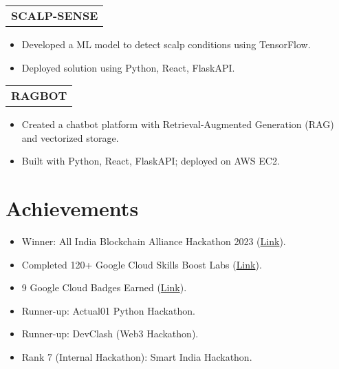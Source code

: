 \documentclass[a4paper,10pt]{article}
\begin{document}
\begin{tabularx}{\linewidth}{@{}X@{}}
\textbf{SCALP-SENSE} \\
\end{tabularx}
\begin{itemize}[nosep,leftmargin=*]
    \item Developed a ML model to detect scalp conditions using TensorFlow.
    \item Deployed solution using Python, React, FlaskAPI.
\end{itemize}

\begin{tabularx}{\linewidth}{@{}X@{}}
\textbf{RAGBOT} \\
\end{tabularx}
\begin{itemize}[nosep,leftmargin=*]
    \item Created a chatbot platform with Retrieval-Augmented Generation (RAG) and vectorized storage.
    \item Built with Python, React, FlaskAPI; deployed on AWS EC2.
\end{itemize}

\section{\textbf{Achievements}}
\begin{itemize}[nosep,leftmargin=*]
    \item Winner: All India Blockchain Alliance Hackathon 2023 (\href{https://drive.google.com/file/d/1Z7MJC7KW8R31a5CgrEwE7D2boVf6nebi/view}{Link}).
    \item Completed 120+ Google Cloud Skills Boost Labs (\href{https://www.cloudskillsboost.google/public_profiles/092c7019-a54d-4eb6-9c63-cc42c4bc8909}{Link}).
    \item 9 Google Cloud Badges Earned (\href{https://www.cloudskillsboost.google/public_profiles/092c7019-a54d-4eb6-9c63-cc42c4bc8909}{Link}).
    \item Runner-up: Actual01 Python Hackathon.
    \item Runner-up: DevClash (Web3 Hackathon).
    \item Rank 7 (Internal Hackathon): Smart India Hackathon.
\end{itemize}
\end{document}
